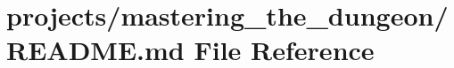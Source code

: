 \hypertarget{projects_2mastering__the__dungeon_2README_8md}{}\section{projects/mastering\+\_\+the\+\_\+dungeon/\+R\+E\+A\+D\+ME.md File Reference}
\label{projects_2mastering__the__dungeon_2README_8md}
